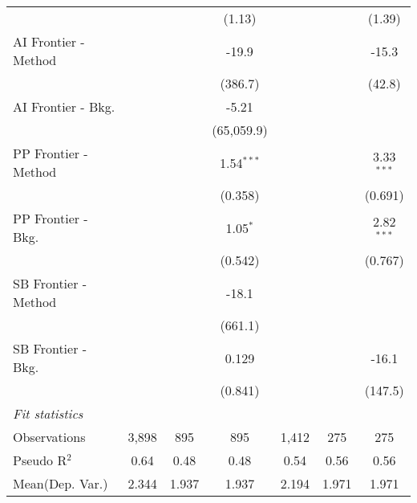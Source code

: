 \begin{tabular}{lcccccc}
                        &              &              & (1.13)       &               &              & (1.39)\\   
   AI Frontier - Method &              &              & -19.9        &               &              & -15.3\\   
                        &              &              & (386.7)      &               &              & (42.8)\\   
   AI Frontier - Bkg.   &              &              & -5.21        &               &              &   \\   
                        &              &              & (65,059.9)   &               &              &   \\   
   PP Frontier - Method &              &              & 1.54$^{***}$ &               &              & 3.33$^{***}$\\   
                        &              &              & (0.358)      &               &              & (0.691)\\   
   PP Frontier - Bkg.   &              &              & 1.05$^{*}$   &               &              & 2.82$^{***}$\\   
                        &              &              & (0.542)      &               &              & (0.767)\\   
   SB Frontier - Method &              &              & -18.1        &               &              &   \\   
                        &              &              & (661.1)      &               &              &   \\   
   SB Frontier - Bkg.   &              &              & 0.129        &               &              & -16.1\\   
                        &              &              & (0.841)      &               &              & (147.5)\\   
   \midrule
   \emph{Fit statistics}\\
   Observations         & 3,898        & 895          & 895          & 1,412         & 275          & 275\\  
   Pseudo R$^2$         & 0.64         & 0.48         & 0.48         & 0.54          & 0.56         & 0.56\\  
Mean(Dep. Var.) & 2.344 & 1.937 & 1.937 & 2.194 & 1.971 & 1.971 \\
   

\end{tabular}
